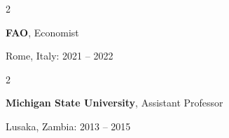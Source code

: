 \documentclass[10pt, letterpaper]{article}
\newenvironment{highlights}{
    \begin{itemize}[
        topsep=0.10 cm,
        parsep=0.10 cm,
        partopsep=0pt,
        itemsep=0pt,
        leftmargin=0.4 cm + 10pt
    ]
}{
    \end{itemize}
} %
\newenvironment{twocolentry}[2][]{
    \onecolentry
    \def\secondColumn{#2}
    \setcolumnwidth{\fill, 6.5 cm}
    \begin{paracol}{2}
}{
    \switchcolumn \raggedleft \secondColumn
    \end{paracol}
    \endonecolentry
} %
\begin{document}
        \vspace{0.2 cm}

        \begin{twocolentry}{
            Rome, Italy: 2021 – 2022

            \vspace*{5pt}
        }
            \textbf{FAO}, Economist
        \end{twocolentry}

        \vspace{0.2 cm}

        \begin{twocolentry}{
            Lusaka, Zambia: 2013 – 2015

            \vspace*{5pt}
        }
            \textbf{Michigan State University}, Assistant Professor
        \end{twocolentry}

        \vspace{0.2 cm}
\end{document}
